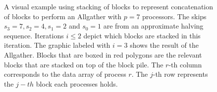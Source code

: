 \begin{figure}[h]
\begin{subfigure}[c]{0.4\textwidth}
	\end{subfigure}
	\caption{A visual example using stacking of blocks to represent concatenation of blocks to perform an Allgather with $p=7$ processors. The skips $s_3=7, s_2 = 4, s_1=2$ and $s_0=1$ are from an approximate halving sequence. Iterations $i\leq2$  depict which blocks are stacked in this iteration. The graphic labeled with $i=3$ shows the result of the Allgather. Blocks that are boxed in red polygons are the relevant blocks that are stacked on top of the block pile. The $r$-th column corresponds to the data array of process $r$. The $j$-th row represents the $j-th$ block each processes holds.}
	\label{fig:blockConcat}
\end{figure}
